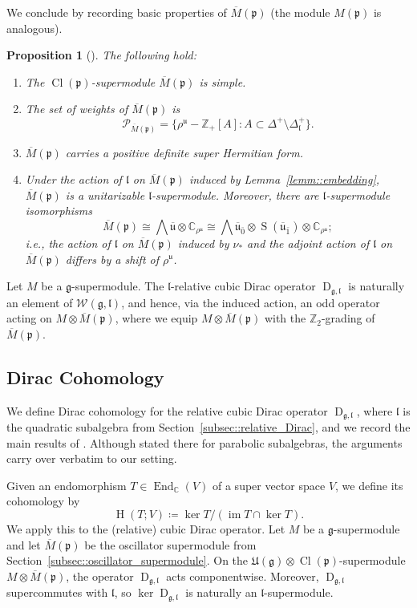 \documentclass[11pt]{amsart}
\renewcommand{\Im}{\operatorname{im}}
\newcommand{\End}{\operatorname{End}}
\newcommand{\Dirac}{\operatorname{D}}
\def\CC{{\mathbb C}}
\def\ubar{{\overline{\mathfrak{u}}}}
\def\Cl{{\operatorname{Cl}}}
\def\pp{{\mathfrak p}}
\def\uu{{\mathfrak u}}
\def\H{{\operatorname{H}}}
\def\ll{{\mathfrak l}}
\def\pp{{\mathfrak p}}
\def\pp{{\mathfrak{p}}}
\def\gg{{\mathfrak{g}}}
\def\ZZ{{\mathbb Z}}
\theoremstyle{plain}
\newtheorem{proposition}[theorem]{Proposition}
\theoremstyle{remark}
\theoremstyle{definition}
\numberwithin{equation}{section}
\theoremstyle{remark}
\begin{document}
We conclude by recording basic properties of $\overline{M}(\pp)$ (the module $M(\pp)$ is analogous). 

\begin{proposition}[{\cite{Schmidt_Noja}}] \label{prop::comparison_action} The following hold:
 \begin{enumerate}
 \item[a)] The $\Cl(\pp)$-supermodule $\overline{M}(\pp)$ is simple. 
 \item[b)] The set of weights of $\overline{M}(\pp)$ is 
 \[
 \mathcal{P}_{\overline{M}(\pp)}=\{\rho^{\uu}-\ZZ_{+}[A] : A \subset \Delta^{+} \setminus \Delta_{\ll}^{+}\}.
 \]
 \item[c)] $\overline{M}(\pp)$ carries a positive definite super Hermitian form.
 \item[d)] Under the action of $\ll$ on $\overline{M}(\pp)$ induced by Lemma~\ref{lemm::embedding}, $\overline{M}(\pp)$ is a unitarizable $\ll$-supermodule. Moreover, there are $\ll$-supermodule isomorphisms
 \[
 \overline{M}(\pp) \cong \bigwedge \ubar \otimes \CC_{\rho^{\uu}} \cong \bigwedge \ubar_{\bar{0}} \otimes \operatorname{S}(\ubar_{\bar{1}}) \otimes \CC_{\rho^{\uu}};
 \]
 \emph{i.e.}, the action of $\ll$ on $\overline{M}(\pp)$ induced by $\nu_{\ast}$ and the adjoint action of $\ll$ on $\overline{M}(\pp)$ differs by a shift of $\rho^{\uu}$.
\end{enumerate}
\end{proposition}

Let $M$ be a $\gg$-supermodule. The $\ll$-relative cubic Dirac operator $\Dirac_{\gg,\ll}$ is naturally an element of $\mathcal{W}(\gg,\ll)$, and hence, via the induced action, an odd operator acting on $M\otimes \overline{M}(\pp)$, where we equip $M\otimes \overline{M}(\pp)$ with the $\ZZ_{2}$-grading of $\overline{M}(\pp)$.


\subsection{Dirac Cohomology} \label{subsec::Dirac_cohomology}
We define Dirac cohomology for the relative cubic Dirac operator $\Dirac_{\gg,\ll}$, where $\ll$ is the quadratic subalgebra from Section~\ref{subsec::relative_Dirac}, and we record the main results of \cite{Schmidt_Noja}. Although stated there for parabolic subalgebras, the arguments carry over verbatim to our setting.

Given an endomorphism $T\in\End_{\CC}(V)$ of a super vector space $V$, we define its cohomology by
\begin{equation}
 \H(T;V)\coloneqq \ker T/(\Im T\cap\ker T).
\end{equation}
We apply this to the (relative) cubic Dirac operator. Let $M$ be a $\gg$-supermodule and let $\overline{M}(\pp)$ be the oscillator
supermodule from Section~\ref{subsec::oscillator_supermodule}. On the $\mathfrak{U}(\gg)\otimes \Cl(\pp)$-supermodule
$M\otimes \overline{M}(\pp)$, the operator $\Dirac_{\gg,\ll}$ acts componentwise.
Moreover, $\Dirac_{\gg,\ll}$ supercommutes with $\ll$, so $\ker \Dirac_{\gg,\ll}$ is naturally an $\ll$-supermodule.
\end{document}
